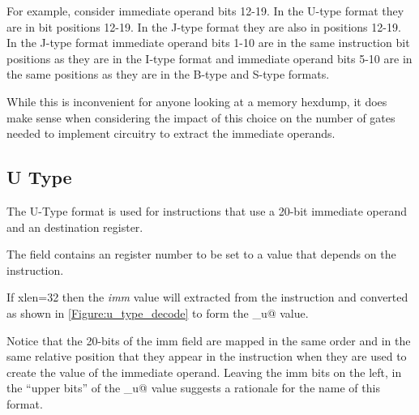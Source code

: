 For example, consider immediate operand bits 12-19.  In the U-type format
they are in bit positions 12-19.  In the J-type format they are also in positions
12-19.  In the J-type format immediate operand bits 1-10 are in the same 
instruction bit positions as they are in the I-type format and immediate
operand bits 5-10 are in the same positions as they are in the B-type and
S-type formats.

While this is inconvenient for anyone looking at a memory hexdump, it does
make sense when considering the impact of this choice on the number of
gates needed to implement circuitry to extract the immediate operands. 


\subsection{U Type}
\label{insnformat:utype}

The U-Type format is used for instructions that use a 20-bit immediate operand 
and an \verb@rd@ destination register.
 

The  field contains an  register number to be set to a value that
depends on the instruction.


If \Gls{xlen}=32 then the {\em imm} value will extracted from the instruction
and converted as shown in \autoref{Figure:u_type_decode} to form the
\verb@imm_u@ value.

\begin{figure}[ht]
\centering
\DrawInsnOpUTypeDecoding
{}
\label{Figure:u_type_decode}
\label{imm.u:decode}
\end{figure}

Notice that the 20-bits of the imm field are mapped in the same order and 
in the same relative position that they appear in the instruction when 
they are used to create the value of the immediate operand.  
Leaving the imm bits on the left, in the ``upper bits'' of the \verb@imm_u@ 
value suggests a rationale for the name of this format.

